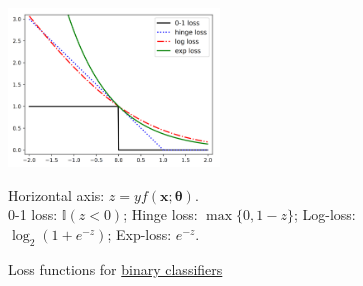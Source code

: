 \begin{figure}[hptb]
    \centering
    \includegraphics[width=0.5\textwidth]{figs/lossfunc.png}
    \caption{Loss functions for \uline{binary classifiers}}
    {\footnotesize Horizontal axis: $z=yf(\bm{x};\bm{\theta})$. \\
    0-1 loss: $\mathbb{I}(z<0)$;
    Hinge loss: $\max\{0,1-z\}$;
    Log-loss: $\log_2{(1+e^{-z})}$;
    Exp-loss: $e^{-z}$.}
    \label{fig:lossfunc}
\end{figure}